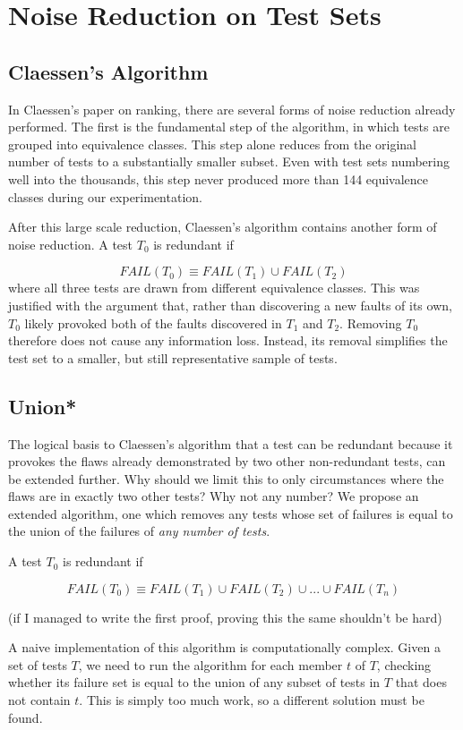 \documentclass[11pt,twoside]{article}
\let\cite=\citep
\begin{document}
\section{Noise Reduction on Test Sets}
\subsection{Claessen's Algorithm}
In Claessen's paper on ranking, there are several forms of noise reduction already performed. The first is the fundamental step of the algorithm, in which tests are grouped into equivalence classes. This step alone reduces from the original number of tests to a substantially smaller subset. Even with test sets numbering well into the thousands, this step never produced more than 144 equivalence classes during our experimentation.

After this large scale reduction, Claessen's algorithm contains another form of noise reduction. A test $T_0$ is redundant if

$$FAIL (T_0) \equiv FAIL(T_1) \cup FAIL(T_2)$$
where all three tests are drawn from different equivalence classes. This was justified with the argument that, rather than discovering a new faults of its own, $T_0$ likely provoked both of the faults discovered in $T_1$ and $T_2$. Removing $T_0$ therefore does not cause any information loss. Instead, its removal simplifies the test set to a smaller, but still representative sample of tests.

\subsection{Union*}
The logical basis to Claessen's algorithm that a test can be redundant because it provokes the flaws already demonstrated by two other non-redundant tests\cite{Claessen}, can be extended further. Why should we limit this to only circumstances where the flaws are in exactly two other tests? Why not any number? We propose an extended algorithm, one which removes any tests whose set of failures is equal to the union of the failures of \emph{any number of tests}. 

A test $T_0$ is redundant if

$$FAIL (T_0) \equiv FAIL(T_1) \cup FAIL(T_2) \cup ... \cup FAIL(T_n) $$

(if I managed to write the first proof, proving this the same shouldn't be hard)

A naive implementation of this algorithm is computationally complex. Given a set of tests $T$, we need to run the algorithm for each member $t$ of $T$, checking whether its failure set is equal to the union of any subset of tests in $T$ that does not contain $t$. This is simply too much work, so a different solution must be found.
\end{document}
